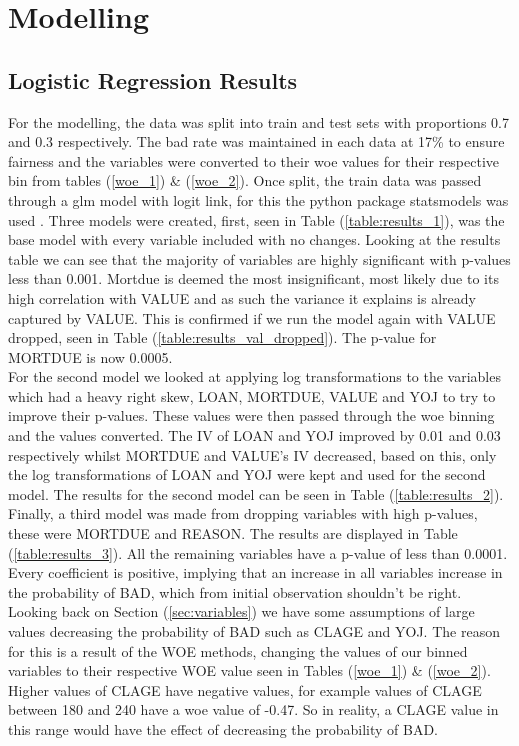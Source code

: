\chapter{Modelling} \label{chapter:4}

\section{Logistic Regression Results}

For the modelling, the data was split into train and test sets with proportions 0.7 and 0.3 respectively. The bad rate was maintained in each data at 17\% to ensure fairness and the variables were converted to their woe values for their respective bin from tables  (\ref{woe_1}) \& (\ref{woe_2}). Once split, the train data was passed through a glm model with logit link, for this the python package statsmodels was used \parencite{statsmodels}. Three models were created, first, seen in Table (\ref{table:results_1}), was the base model with every variable included with no changes. Looking at the results table we can see that the majority of variables are highly significant with p-values less than 0.001. Mortdue is deemed the most insignificant, most likely due to its high correlation with VALUE and as such the variance it explains is already captured by VALUE. This is confirmed if we run the model again with VALUE dropped, seen in Table (\ref{table:results_val_dropped}). The p-value for MORTDUE is now 0.0005. \\

For the second model we looked at applying log transformations to the variables which had a heavy right skew, LOAN, MORTDUE, VALUE and YOJ to try to improve their p-values. These values were then passed through the woe binning and the values converted. The IV of LOAN and YOJ improved by 0.01 and 0.03 respectively whilst MORTDUE and VALUE's IV decreased, based on this, only the log transformations of LOAN and YOJ were kept and used for the second model. The results for the second model can be seen in Table (\ref{table:results_2}). \\

Finally, a third model was made from dropping variables with high p-values, these were MORTDUE and REASON. The results are displayed in Table (\ref{table:results_3}). All the remaining variables have a p-value of less than 0.0001. Every coefficient is positive, implying that an increase in all variables increase in the probability of BAD, which from initial observation shouldn't be right. Looking back on Section (\ref{sec:variables}) we have some assumptions of large values decreasing the probability of BAD such as CLAGE and YOJ. The reason for this is a result of the WOE methods, changing the values of our binned variables to their respective WOE value seen in Tables (\ref{woe_1}) \& (\ref{woe_2}). Higher values of CLAGE have negative values, for example values of CLAGE between 180 and 240 have a woe value of -0.47. So in reality, a CLAGE value in this range would have the effect of decreasing the probability of BAD. \\

